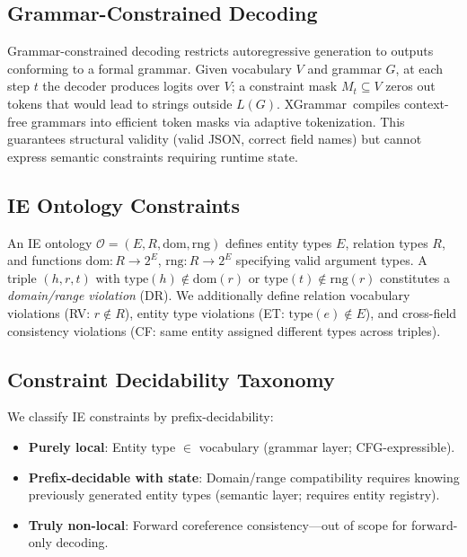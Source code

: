 \documentclass[11pt]{article}
\begin{document}
\subsection{Grammar-Constrained Decoding}

Grammar-constrained decoding restricts autoregressive generation to outputs conforming to a formal grammar. Given vocabulary $V$ and grammar $G$, at each step $t$ the decoder produces logits over $V$; a constraint mask $M_t \subseteq V$ zeros out tokens that would lead to strings outside $L(G)$. XGrammar~compiles context-free grammars into efficient token masks via adaptive tokenization. This guarantees structural validity (valid JSON, correct field names) but cannot express semantic constraints requiring runtime state.

\subsection{IE Ontology Constraints}

An IE ontology $\mathcal{O} = (E, R, \text{dom}, \text{rng})$ defines entity types $E$, relation types $R$, and functions $\text{dom}: R \to 2^E$, $\text{rng}: R \to 2^E$ specifying valid argument types. A triple $(h, r, t)$ with $\text{type}(h) \notin \text{dom}(r)$ or $\text{type}(t) \notin \text{rng}(r)$ constitutes a \emph{domain/range violation} (DR). We additionally define relation vocabulary violations (RV: $r \notin R$), entity type violations (ET: $\text{type}(e) \notin E$), and cross-field consistency violations (CF: same entity assigned different types across triples).

\subsection{Constraint Decidability Taxonomy}

We classify IE constraints by prefix-decidability:
\begin{itemize}
\item[(a)] \textbf{Purely local}: Entity type $\in$ vocabulary (grammar layer; CFG-expressible).
\item[(b)] \textbf{Prefix-decidable with state}: Domain/range compatibility requires knowing previously generated entity types (semantic layer; requires entity registry).
\item[(c)] \textbf{Truly non-local}: Forward coreference consistency---out of scope for forward-only decoding.
\end{itemize}
\end{document}
